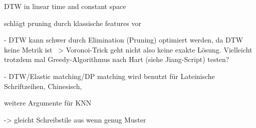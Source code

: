 
\cite{MacLean:2010p9970} DTW in linear time and constant space

\cite{Watt:2005p1816} schlägt pruning durch klassische features vor

- DTW kann schwer durch Elimination (Pruning) optimiert werden, da DTW keine Metrik ist ~> Voronoi-Trick geht nicht also keine exakte Lösung. Vielleicht trotzdem mal Greedy-Algorithmus nach Hart (siehe Jiang-Script) testen?

- DTW/Elastic matching/DP matching wird benutzt für Lateinische Schriftzeihen, Chinesisch, \cite{Tappert:1990p10302}

weitere Argumente für KNN

-> gleicht Schreibstile aus wenn genug Muster
